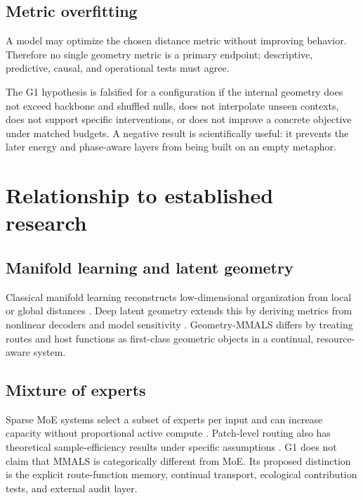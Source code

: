 \documentclass[11pt,a4paper]{article}
\begin{document}
\subsection{Metric overfitting}

A model may optimize the chosen distance metric without improving behavior. Therefore no single geometry metric is a primary endpoint; descriptive, predictive, causal, and operational tests must agree.

\begin{warningbox}
The G1 hypothesis is falsified for a configuration if the internal geometry does not exceed backbone and shuffled nulls, does not interpolate unseen contexts, does not support specific interventions, or does not improve a concrete objective under matched budgets. A negative result is scientifically useful: it prevents the later energy and phase-aware layers from being built on an empty metaphor.
\end{warningbox}

\section{Relationship to established research}

\subsection{Manifold learning and latent geometry}

Classical manifold learning reconstructs low-dimensional organization from local or global distances \citep{tenenbaum2000isomap,roweis2000lle}. Deep latent geometry extends this by deriving metrics from nonlinear decoders and model sensitivity \citep{arvanitidis2018latent,shao2018riemannian}. Geometry-MMALS differs by treating routes and host functions as first-class geometric objects in a continual, resource-aware system.

\subsection{Mixture of experts}

Sparse MoE systems select a subset of experts per input and can increase capacity without proportional active compute \citep{shazeer2017moe,fedus2022switch}. Patch-level routing also has theoretical sample-efficiency results under specific assumptions \citep{chowdhury2023patchmoe}. G1 does not claim that MMALS is categorically different from MoE. Its proposed distinction is the explicit route-function memory, continual transport, ecological contribution tests, and external audit layer.
\end{document}
